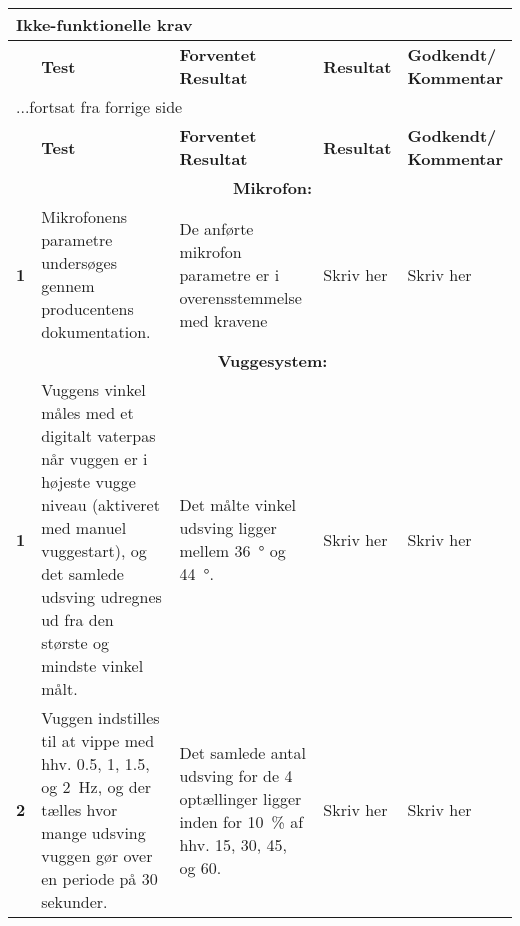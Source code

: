 \begin{center}
\label{accepttest:ikkefunktionellekrav} 
\begin{longtable}{|p{}|p{}|p{}|p{}|p{}|} %
\hline
\multicolumn{5}{|l|}{\textbf{Ikke-funktionelle krav}} \\ \hline
\multicolumn{1}{|c|}{} &
\textbf{Test} &
\textbf{Forventet \newline Resultat} &
\textbf{Resultat} &
\textbf{Godkendt/ \newline Kommentar} \\ \hline 
\endfirsthead

\multicolumn{5}{l}{...fortsat fra forrige side} \\ \hline 
\multicolumn{1}{|c|}{} &
\textbf{Test} &
\textbf{Forventet \newline Resultat} &
\textbf{Resultat} &
\textbf{Godkendt/ \newline Kommentar} \\ \hline 
\endhead




&\multicolumn{4}{|c|}{\textbf{Mikrofon:}} \\ \hline

\textbf{1}	&Mikrofonens parametre undersøges gennem producentens dokumentation.

			&De anførte mikrofon parametre er i overensstemmelse med kravene
			
			&Skriv her
			&Skriv her 
			\\ \hline

&\multicolumn{4}{|c|}{\textbf{Vuggesystem:}} \\ \hline

\textbf{1}	&Vuggens vinkel måles med et digitalt vaterpas når vuggen er i højeste vugge niveau (aktiveret med manuel vuggestart), og det samlede udsving udregnes ud fra den største og mindste vinkel målt.

			&Det målte vinkel udsving ligger mellem \SI{36}{\degree} og \SI{44}{\degree}.
			
			&Skriv her
			&Skriv her 
			\\\hline
			 
\textbf{2}	&Vuggen indstilles til at vippe med hhv. 0.5, 1, 1.5, og \SI{2}{\hertz}, og der tælles hvor mange udsving vuggen gør over en periode på 30 sekunder. 

			& Det samlede antal udsving for de 4 optællinger ligger inden for \SI{10}{\percent} af hhv. 15, 30, 45, og 60.
			
			&Skriv her
			&Skriv her
			\\\hline

\end{longtable}
\end{center}


